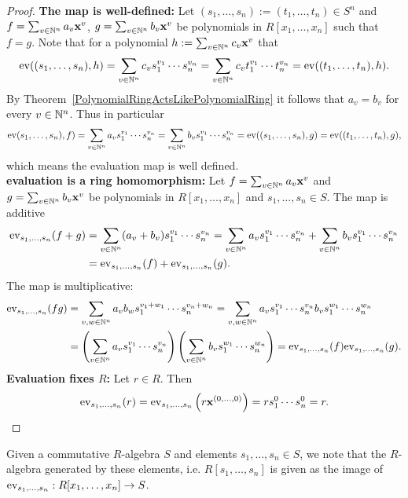 \begin{proof}
    \textbf{The map is well-defined:} Let $(s_1,\dots,s_n):=(t_1,\dots,t_n)\in S^n$ and $f = \sum_{v\in \mathbb{N}^n} a_v \mathbf{x}^v$, $g = \sum_{v\in \mathbb{N}^n} b_v\mathbf{x}^v$ be polynomials in $R[x_1,\dots,x_n]$ such that $f=g$. Note that for a polynomial $h:=\sum_{v\in \mathbb{N}^n} c_v\mathbf{x}^v$ that 
    $$\mathrm{ev}((s_1,\dots,s_n),h)=\sum_{v\in\mathbb{N}^n} c_vs_1^{v_1}\cdots s_n^{v_n}= \sum_{v\in\mathbb{N}^n} c_vt_1^{v_1}\cdots t_n^{v_n} = \mathrm{ev}((t_1,\dots,t_n),h).$$
    By Theorem~\ref{PolynomialRingActsLikePolynomialRing} it follows that $a_v = b_v$ for every $v\in \mathbb{N}^n$. Thus in particular
    $$\mathrm{ev}(s_1,\dots,s_n),f) = \sum_{v\in \mathbb{N}^n} a_v s_1^{v_1}\cdots s_n^{v_n} = \sum_{v\in \mathbb{N}^n} b_v s_1^{v_1}\cdots s_n^{v_n} = \mathrm{ev}((s_1,\dots,s_n),g) = \mathrm{ev}((t_1,\dots,t_n),g),$$
    which means the evaluation map is well defined.\\
    \textbf{evaluation is a ring homomorphism:} Let $f = \sum_{v\in \mathbb{N}^n} a_v \mathbf{x}^v$ and $g = \sum_{v\in \mathbb{N}^n} b_v\mathbf{x}^v$ be polynomials in $R[x_1,\dots,x_n]$ and $s_1,\dots,s_n\in S$. The map is additive
    \begin{align*}
        \mathrm{ev}_{s_1,\dots,s_n}(f+g) &= \sum_{v\in\mathbb{N}^n} (a_v+b_v)s_1^{v_1}\cdots s_n^{v_n} = \sum_{v\in \mathbb{N}^n} a_vs_1^{v_1}\cdots s_n^{v_n} +\sum_{v\in \mathbb{N}^n}b_vs_1^{v_1}\cdots s_n^{v_n}\\ &= \mathrm{ev}_{s_1,\dots,s_n}(f)+\mathrm{ev}_{s_1,\dots,s_n}(g).
    \end{align*}
    The map is multiplicative: 
    \begin{align*}
        \mathrm{ev}_{s_1,\dots,s_n}(fg) &= \sum_{v,w\in \mathbb{N}^n} a_vb_w s_1^{v_1+w_1}\cdots s_n^{v_n+w_n} = \sum_{v,w\in \mathbb{N}^n} a_vs_1^{v_1}\cdots s_n^{v_n}b_vs_1^{w_1}\cdots s_n^{w_n}\\
        &= \left(\sum_{v\in \mathbb{N}^n} a_vs_1^{v_1}\cdots s_n^{v_n}\right)\left(\sum_{v\in \mathbb{N}^n} b_vs_1^{w_1}\cdots s_n^{w_n}\right) = \mathrm{ev}_{s_1,\dots,s_n}(f)\mathrm{ev}_{s_1,\dots,s_n}(g).
    \end{align*}
    \textbf{Evaluation fixes $R$:}
    Let $r\in R$. Then
    $$\mathrm{ev}_{s_1,\dots,s_n}(r)= \mathrm{ev}_{s_1,\dots,s_n}\left(r\mathbf{x}^{(0,\dots,0)}\right) = r s_1^{0}\cdots s_n^{0} = r.$$
\end{proof}
\begin{remark}
     Given a commutative $R$-algebra $S$ and elements $s_1,\dots,s_n\in S$, we note that the $R$-algebra generated by these elements, i.e. $R[s_1,\dots,s_n]$ is given as the image of $\mathrm{ev}_{s_1,\dots,s_n}: R[x_1,\dots,x_n]\rightarrow S$.
\end{remark}
